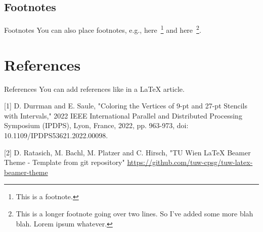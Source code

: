 \documentclass{beamer}
\begin{document}
\subsection{Footnotes}
\begin{frame}{Footnotes}
  You can also place footnotes, e.g.,
  here~\footnote{This is a footnote.}
  and here~\footnote{This is a longer footnote going over two lines.
    So I've added some more blah blah. Lorem ipsum whatever.}.
\end{frame}

\section{References}
\begin{frame}{References}
  You can add references like in a LaTeX article.

  \begin{thebibliography}{10}
  [1] D. Durrman and E. Saule, "Coloring the Vertices of 9-pt and 27-pt Stencils with Intervals," 2022 IEEE International Parallel and Distributed Processing Symposium (IPDPS), Lyon, France, 2022, pp. 963-973, doi: 10.1109/IPDPS53621.2022.00098.
  
  [2] D. Ratasich, M. Bachl, M. Platzer and C. Hirsch, "TU Wien LaTeX Beamer Theme -
  Template from git repository" 
  \url{https://github.com/tuw-cpsg/tuw-latex-beamer-theme}
  \end{thebibliography}
\end{frame}
\end{document}
